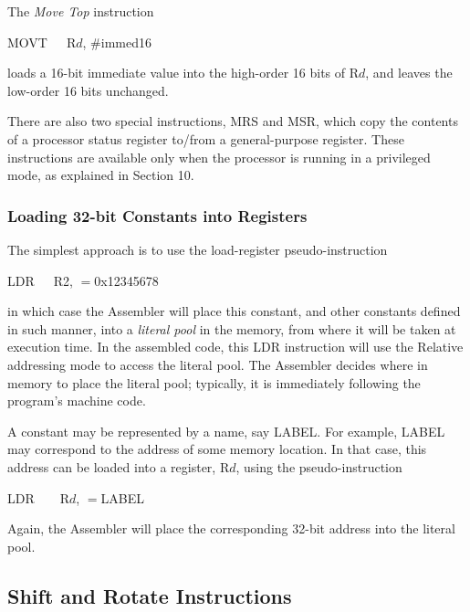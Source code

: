 \documentclass[11pt, twoside, pdftex]{article}
\begin{document}
The {\it Move Top} instruction
\begin{center}
MOVT~~~R$d$, \#immed16
\end{center}
\noindent
loads a 16-bit immediate value into the high-order 16 bits of
R$d$, and leaves the low-order 16 bits unchanged.

There are also two special instructions, MRS and MSR, which copy
the contents of a processor status register to/from a
general-purpose register. These instructions are available only
when the processor is running in a privileged mode, as explained
in Section 10.

\subsubsection{Loading 32-bit Constants into Registers}
\label{sec:ldr}

The simplest approach is to use the load-register pseudo-instruction
\begin{center}
LDR~~~R2, $=$0x12345678
\end{center}
\noindent
in which case the Assembler will place this constant, and other
constants defined in such manner, into a {\it literal pool} in the memory, from where 
it will be taken at execution time.
In the assembled code, this LDR instruction will use the Relative
addressing mode to access the literal pool. The Assembler decides
where in memory to place the literal pool; typically, it is
immediately following the program's machine code.

A constant may be represented by a name, say LABEL. For example,
LABEL may correspond to the address of some memory location. In 
that case, this address can be loaded into a register, R$d$,
using the pseudo-instruction
\begin{center}
LDR~~~~R$d$, $=$LABEL
\end{center}
\noindent
Again, the Assembler will place the corresponding 32-bit address
into the literal pool.

\subsection{Shift and Rotate Instructions}
\label{sec:shifts}
\end{document}
